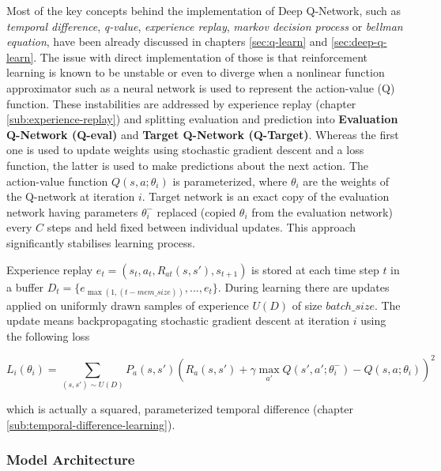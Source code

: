 Most of the key concepts behind the implementation of Deep Q-Network, such as \emph{temporal difference}, \emph{q-value}, \emph{experience replay}, \emph{markov decision process} or \emph{bellman equation}, have been already discussed in chapters \ref{sec:q-learn} and \ref{sec:deep-q-learn}.
The issue with direct implementation of those is that reinforcement learning is known to be unstable or even to diverge when a nonlinear function approximator such as a neural network is used to represent the action-value (Q) function. These instabilities are addressed by experience replay (chapter \ref{sub:experience-replay}) and splitting evaluation and prediction into \textbf{Evaluation Q-Network (Q-eval)} and \textbf{Target Q-Network (Q-Target)}. Whereas the first one is used to update weights using stochastic gradient descent and a loss function, the latter is used to make predictions about the next action. The action-value function $Q(s, a; \theta_i)$ is parameterized, where $\theta_i$ are the weights of the Q-network at iteration $i$. Target network is an exact copy of the evaluation network having parameters $\theta^-_i$ replaced (copied $\theta_i$ from the evaluation network) every $C$ steps and held fixed between individual updates. This approach significantly stabilises learning process.

Experience replay $e_t = (s_t, a_t, R_{at}(s, s'), s_{t+1})$ is stored at each time step $t$ in a buffer $D_t = \{e_{\max\left(1, (t - mem\_size)\right)}, ..., e_t\}$. During learning there are updates applied on uniformly drawn samples of experience $U(D)$ of size $batch\_size$. The update means backpropagating stochastic gradient descent at iteration $i$ using the following loss

\begin{equation}
    L_i(\theta_i) = \sum_{(s, s') \sim U(D)}P_a(s, s')\left(R_a(s, s') + \gamma \max_{a'} Q(s', a'; \theta^-_i) - Q(s, a; \theta_i) \right)^2
\label{eq:deep-q-loss}
\end{equation}

which is actually a squared, parameterized temporal difference (chapter \ref{sub:temporal-difference-learning}).

\subsubsection*{Model Architecture}
\label{sub2:model architecture}

